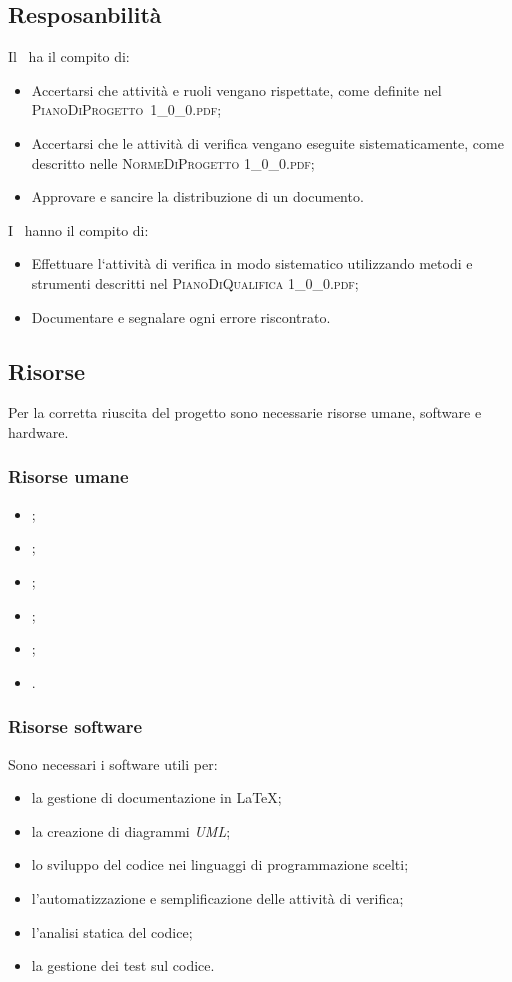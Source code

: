 	
	\subsection{Resposanbilità}
	Il \textit{\RdP}\ ha il compito di:
	\begin{itemize}
		\item Accertarsi che attività e ruoli vengano rispettate, come definite nel \hbox{\textsc{PianoDiProgetto 1\_0\_0.pdf}};
		\item Accertarsi che le attività di verifica vengano eseguite sistematicamente, come descritto nelle \textsc{NormeDiProgetto 1\_0\_0.pdf};
		\item Approvare e sancire la distribuzione di un documento.
	\end{itemize}

	I \textit{\Vers}\ hanno il compito di:
	\begin{itemize}
		\item Effettuare l‘attività di verifica in modo sistematico utilizzando metodi e strumenti descritti nel \textsc{PianoDiQualifica 1\_0\_0.pdf};
		\item Documentare e segnalare ogni errore riscontrato.
	\end{itemize}	
	
	
	\subsection{Risorse}
	Per la corretta riuscita del progetto sono necessarie risorse umane, software e hardware.
	
		\subsubsection{Risorse umane}
		\begin{itemize}
			\item \textit{\RdP};
			\item \textit{\Res};
			\item \textit{\Amm};
			\item \textit{\Ver};
			\item \textit{\Prog};
			\item \textit{\Ana}.
		\end{itemize}
		
		\subsubsection{Risorse software}
		Sono necessari i software utili per:
		\begin{itemize}
			\item la gestione di documentazione in \LaTeX;
			\item la creazione di diagrammi \textit{UML};
			\item lo sviluppo del codice nei linguaggi di programmazione scelti;
			\item l'automatizzazione e semplificazione delle attività di verifica;
			\item l'analisi statica del codice;
			\item la gestione dei test sul codice.
		\end{itemize}
		

